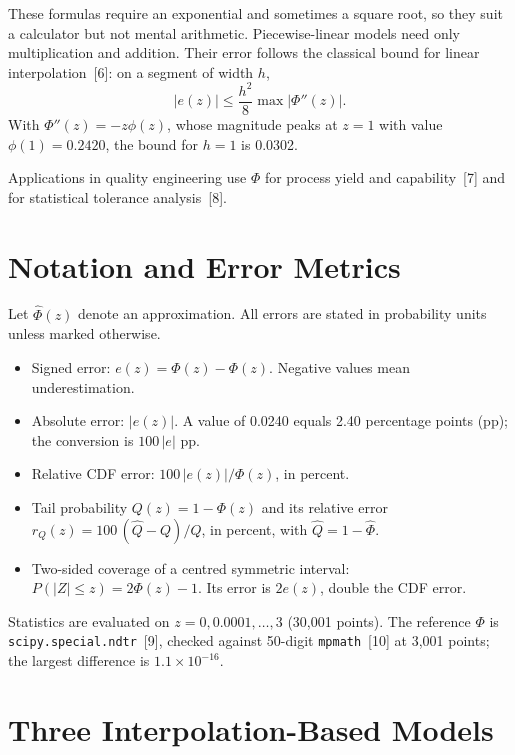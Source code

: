 \documentclass[10pt,a4paper]{article}
\newcommand{\Phihat}{\hat{\Phi}}
\begin{document}
These formulas require an exponential and sometimes a square root, so they suit a calculator but not mental arithmetic. Piecewise-linear models need only multiplication and addition. Their error follows the classical bound for linear interpolation~[6]: on a segment of width $h$,
\begin{equation}\label{eq:bound}
|e(z)| \le \frac{h^{2}}{8}\max |\Phi''(z)| .
\end{equation}
With $\Phi''(z) = -z\phi(z)$, whose magnitude peaks at $z=1$ with value $\phi(1) = 0.2420$, the bound for $h = 1$ is 0.0302.

Applications in quality engineering use $\Phi$ for process yield and capability~[7] and for statistical tolerance analysis~[8].

\section{Notation and Error Metrics}

Let $\Phihat(z)$ denote an approximation. All errors are stated in probability units unless marked otherwise.

\begin{itemize}[leftmargin=1.4em,itemsep=2pt]
\item Signed error: $e(z) = \Phihat(z) - \Phi(z)$. Negative values mean underestimation.
\item Absolute error: $|e(z)|$. A value of 0.0240 equals 2.40 percentage points (pp); the conversion is $100\,|e|$ pp.
\item Relative CDF error: $100\,|e(z)|/\Phi(z)$, in percent.
\item Tail probability $Q(z) = 1 - \Phi(z)$ and its relative error $r_Q(z) = 100\,(\hat{Q}-Q)/Q$, in percent, with $\hat{Q} = 1-\Phihat$.
\item Two-sided coverage of a centred symmetric interval: $P(|Z|\le z) = 2\Phi(z) - 1$. Its error is $2e(z)$, double the CDF error.
\end{itemize}

Statistics are evaluated on $z = 0, 0.0001, \ldots, 3$ (30{,}001 points). The reference $\Phi$ is \texttt{scipy.special.ndtr}~[9], checked against 50-digit \texttt{mpmath}~[10] at 3{,}001 points; the largest difference is $1.1\times10^{-16}$.

\section{Three Interpolation-Based Models}
\end{document}
